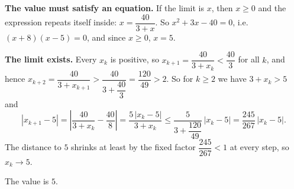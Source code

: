 \textbf{The value must satisfy an equation.} If the limit is $x$, then $x\ge0$ and the expression repeats itself inside: $x=\dfrac{40}{3+x}$. So $x^2+3x-40=0$, i.e.\ $(x+8)(x-5)=0$, and since $x\ge0$, $x=5$.

\textbf{The limit exists.} Every $x_k$ is positive, so $x_{k+1}=\dfrac{40}{3+x_k}<\dfrac{40}{3}$ for all $k$, and hence $x_{k+2}=\dfrac{40}{3+x_{k+1}}>\dfrac{40}{3+\dfrac{40}{3}}=\dfrac{120}{49}>2$. So for $k\ge2$ we have $3+x_k>5$ and
\[
|x_{k+1}-5|=\left|\dfrac{40}{3+x_k}-\dfrac{40}{8}\right|=\dfrac{5\,|x_k-5|}{3+x_k}\le\dfrac{5}{3+\dfrac{120}{49}}\,|x_k-5|=\dfrac{245}{267}\,|x_k-5| .
\]
The distance to $5$ shrinks at least by the fixed factor $\dfrac{245}{267}<1$ at every step, so $x_k\to5$.

The value is $\boxed{5}$.
